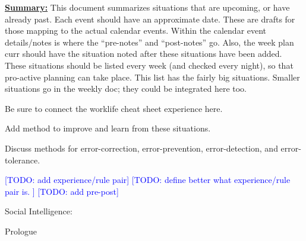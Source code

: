 \documentclass[11pt]{article}
\newcommand{\todo}[1]{\textcolor{blue}{[TODO: #1]}}
\begin{document}
\underline{\textbf{Summary:}} This document summarizes situations that
are upcoming, or have already past. Each event should have an
approximate date. These are drafts for those mapping to the actual calendar events.  Within
the calendar event details/notes is where the ``pre-notes'' and
``post-notes'' go. Also, the week plan curr should have the situation
noted after these situations have been added.  These situations should
be listed every week (and checked every night), so that pro-active planning can take place.
This list has the fairly big situations. Smaller situations go in the
weekly doc; they could be integrated here too. 

Be sure to connect the worklife cheat sheet experience here. 

Add method to improve and learn from these situations. 

Discuss methods for error-correction, error-prevention,
error-detection, and error-tolerance.  

\todo{add experience/rule pair}  
\todo{define better what experience/rule pair is. }
\todo{add pre-post} 













Social Intelligence: 


Prologue
\end{document}
